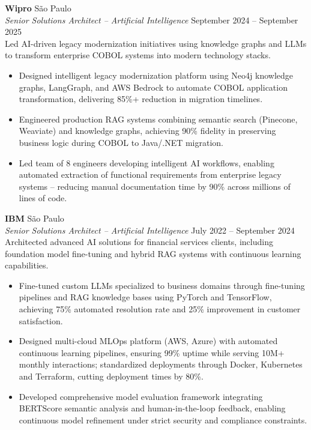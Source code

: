 \documentclass[a4paper]{article}
\begin{document}
\textbf{Wipro} \hfill São Paulo\\
\textit{Senior Solutions Architect -- Artificial Intelligence} \hfill September 2024 -- September 2025\\[2pt]
Led AI-driven legacy modernization initiatives using knowledge graphs and LLMs to transform enterprise COBOL systems into modern technology stacks.
\vspace{1mm}
\begin{itemize}
\item Designed intelligent legacy modernization platform using Neo4j knowledge graphs, LangGraph, and AWS Bedrock to automate COBOL application transformation, delivering 85\%+ reduction in migration timelines.
\item Engineered production RAG systems combining semantic search (Pinecone, Weaviate) and knowledge graphs, achieving 90\% fidelity in preserving business logic during COBOL to Java/.NET migration.
\item Led team of 8 engineers developing intelligent AI workflows, enabling automated extraction of functional requirements from enterprise legacy systems -- reducing manual documentation time by 90\% across millions of lines of code.
\end{itemize}
\vspace{1mm}

\textbf{IBM} \hfill São Paulo\\
\textit{Senior Solutions Architect -- Artificial Intelligence} \hfill July 2022 -- September 2024\\[2pt]
Architected advanced AI solutions for financial services clients, including foundation model fine-tuning and hybrid RAG systems with continuous learning capabilities.
\vspace{1mm}
\begin{itemize}
\item Fine-tuned custom LLMs specialized to business domains through fine-tuning pipelines and RAG knowledge bases using PyTorch and TensorFlow, achieving 75\% automated resolution rate and 25\% improvement in customer satisfaction.
\item Designed multi-cloud MLOps platform (AWS, Azure) with automated continuous learning pipelines, ensuring 99\% uptime while serving 10M+ monthly interactions; standardized deployments through Docker, Kubernetes and Terraform, cutting deployment times by 80\%.
\item Developed comprehensive model evaluation framework integrating BERTScore semantic analysis and human-in-the-loop feedback, enabling continuous model refinement under strict security and compliance constraints.
\end{itemize}
\vspace{1mm}
\end{document}
